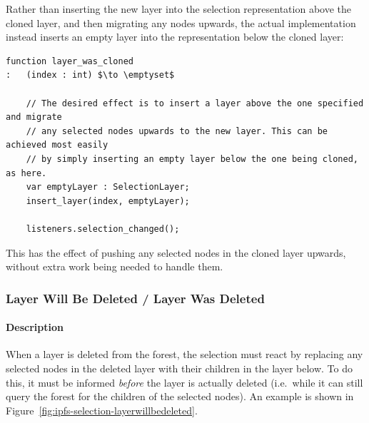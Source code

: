 Rather than inserting the new layer into the selection representation above the cloned layer, and then migrating any nodes upwards, the actual implementation instead inserts an empty layer into the representation below the cloned layer:

\begin{lstlisting}[style=Default,backgroundcolor={\color[gray]{0.8}}]
function layer_was_cloned
:	(index : int) $\to \emptyset$

	// The desired effect is to insert a layer above the one specified and migrate
	// any selected nodes upwards to the new layer. This can be achieved most easily
	// by simply inserting an empty layer below the one being cloned, as here.
	var emptyLayer : SelectionLayer;
	insert_layer(index, emptyLayer);

	listeners.selection_changed();
\end{lstlisting}

\noindent This has the effect of pushing any selected nodes in the cloned layer upwards, without extra work being needed to handle them.


\newpage

\subsubsection{Layer Will Be Deleted / Layer Was Deleted}


\paragraph{Description}

When a layer is deleted from the forest, the selection must react by replacing any selected nodes in the deleted layer with their children in the layer below. To do this, it must be informed \emph{before} the layer is actually deleted (i.e.~while it can still query the forest for the children of the selected nodes). An example is shown in Figure~\ref{fig:ipfs-selection-layerwillbedeleted}.

